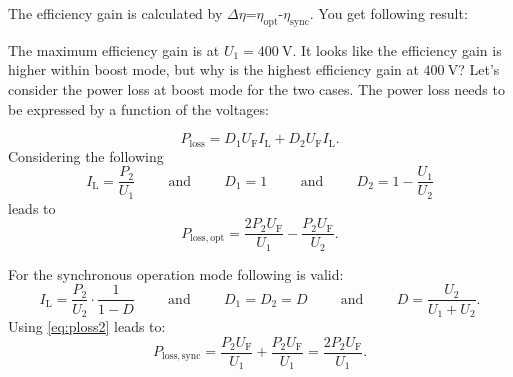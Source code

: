 \begin{solutionblock}
    The efficiency gain is calculated by $\Delta \eta$=$\eta_\mathrm{opt}$-$\eta_\mathrm{sync}$.
    You get following result:

    
    
    The maximum efficiency gain is at $U_\mathrm{1}=\SI{400}{\volt}$.
    It looks like the efficiency gain is higher within boost mode, but why is the highest efficiency gain at $\SI{400}{\volt}$?
    Let's consider the power loss at boost mode for the two cases. The power loss needs to be expressed by a function of the voltages:

    \begin{equation}
        P_\mathrm{loss}=D_1 U_\mathrm{F} I_\mathrm{L} + D_2 U_\mathrm{F} I_\mathrm{L}.
        \label{eq:ploss2}
    \end{equation}
    Considering the following
    \begin{equation}
        I_\mathrm{L}=\frac{P_\mathrm{2}}{U_\mathrm{1}} 
        \hspace{1cm} \mathrm{and} \hspace{1cm}
        D_1=1
        \hspace{1cm} \mathrm{and} \hspace{1cm}
        D_2=1-\frac{U_\mathrm{1}}{U_\mathrm{2}} 
    \end{equation}
    leads to
    \begin{equation}
        P_\mathrm{loss,opt}=\frac{2 P_\mathrm{2} U_\mathrm{F}}{U_\mathrm{1}} - \frac{P_\mathrm{2} U_\mathrm{F}}{U_\mathrm{2}}.
        \label{eq:Plossopt}
    \end{equation}

    For the synchronous operation mode following is valid:
    \begin{equation}
        I_\mathrm{L}=\frac{P_\mathrm{2}}{U_\mathrm{2}} \cdot \frac{1}{1-D}  
        \hspace{1cm} \mathrm{and} \hspace{1cm}
        D_1=D_2=D
        \hspace{1cm} \mathrm{and} \hspace{1cm}
        D=\frac{U_\mathrm{2}}{U_\mathrm{1}+U_\mathrm{2}}.
    \end{equation}
    Using \eqref{eq:ploss2} leads to:
    \begin{equation}
        P_\mathrm{loss,sync}=\frac{P_\mathrm{2} U_\mathrm{F}}{U_\mathrm{1}} + \frac{P_\mathrm{2} U_\mathrm{F}}{U_\mathrm{1}}=\frac{2 P_\mathrm{2} U_\mathrm{F}}{U_\mathrm{1}}.
        \label{eq:Plosssync}
    \end{equation}


\end{solutionblock}
